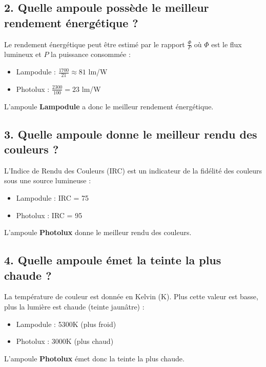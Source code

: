 \documentclass[a4paper,11pt]{article}
\begin{document}
\subsection*{2. Quelle ampoule possède le meilleur rendement énergétique ?}
Le rendement énergétique peut être estimé par le rapport \( \frac{\Phi}{P} \) où \( \Phi \) est le flux lumineux et \( P \) la puissance consommée :
\begin{itemize}
    \item Lampodule : \( \frac{1700}{21} \approx 81 \) lm/W
    \item Photolux : \( \frac{2300}{100} = 23 \) lm/W
\end{itemize}
L'ampoule \textbf{Lampodule} a donc le meilleur rendement énergétique.

\subsection*{3. Quelle ampoule donne le meilleur rendu des couleurs ?}
L'Indice de Rendu des Couleurs (IRC) est un indicateur de la fidélité des couleurs sous une source lumineuse :
\begin{itemize}
    \item Lampodule : IRC = 75
    \item Photolux : IRC = 95
\end{itemize}
L'ampoule \textbf{Photolux} donne le meilleur rendu des couleurs.

\subsection*{4. Quelle ampoule émet la teinte la plus chaude ?}
La température de couleur est donnée en Kelvin (K). Plus cette valeur est basse, plus la lumière est chaude (teinte jaunâtre) :
\begin{itemize}
    \item Lampodule : 5300K (plus froid)
    \item Photolux : 3000K (plus chaud)
\end{itemize}
L'ampoule \textbf{Photolux} émet donc la teinte la plus chaude.
\end{document}
